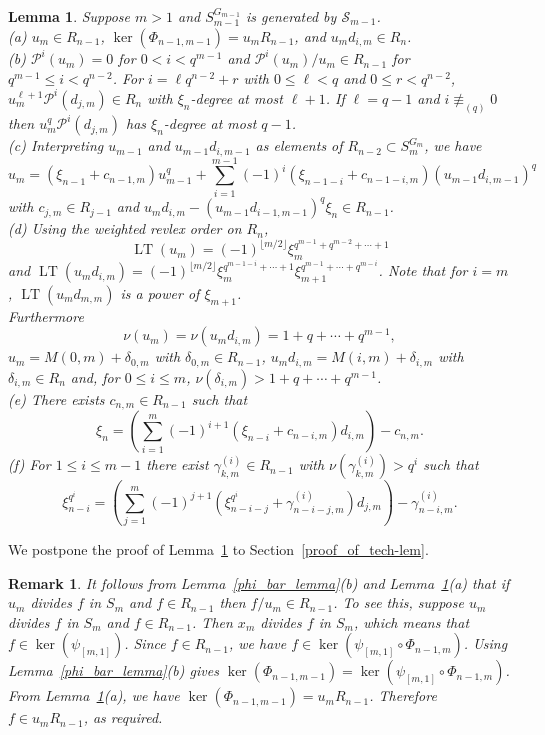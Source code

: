 \documentclass{amsart}
\newcommand{\PP}{\mathcal{P}}
\newcommand{\cS}{\mathcal{S}}
\newtheorem{lem}[subsection]{Lemma}
\newtheorem{remark}[subsection]{Remark}
\DeclareMathOperator{\lt}{LT}
\begin{document}
\begin{lem}\label{oplus_tech-lem} Suppose $m>1$ and 
$S_{m-1}^{G_{m-1}}$ is generated by 
$\cS_{m-1}$.\\
(a) $u_m\in R_{n-1}$, $\ker(\Phi_{n-1,m-1})=u_m R_{n-1}$, 
and $u_m d_{i,m}\in R_{n}$.\\
(b) $\PP^i(u_m)=0$ for $0<i<q^{m-1}$ 
and $\PP^i(u_m)/u_m\in R_{n-1}$ for $q^{m-1}\leq i<q^{n-2}$.
For $i=\ell q^{n-2}+r$ with $0\leq\ell<q$ and $0\leq r<q^{n-2}$, $u_m^{\ell+1}\PP^i(d_{j,m})\in R_{n}$ 
with $\xi_{n}$-degree at most $\ell+1$. If $\ell=q-1$ and $i\not\equiv_{(q)} 0$ then 
$u_m^q\PP^i(d_{j,m})$ has $\xi_{n}$-degree at most $q-1$.\\
(c) Interpreting $u_{m-1}$ and $u_{m-1} d_{i,m-1}$ as elements of $R_{n-2}\subset S_m^{G_m}$, we have
$$u_m=(\xi_{n-1}+c_{n-1,m})u_{m-1}^q+\sum_{i=1}^{m-1}(-1)^i(\xi_{n-1-i}+c_{n-1-i,m})(u_{m-1}d_{i,m-1})^q$$
with $c_{j,m}\in R_{j-1}$ and $u_m d_{i,m}-(u_{m-1}d_{i-1,m-1})^q\xi_{n}\in R_{n-1}$. \\
(d) Using the weighted revlex order on $R_{n}$, 
$$\lt(u_m)=(-1)^{\lfloor m/2 \rfloor}\xi_{m}^{q^{m-1}+q^{m-2}+\cdots+1}$$ and 
$\lt(u_m d_{i,m})=(-1)^{\lfloor m/2 \rfloor}\xi_{m}^{q^{m-1-i}+\cdots+1}\xi_{m+1}^{q^{m-1}+\cdots+q^{m-i}}$.
Note that for $i=m$, $\lt(u_m d_{m,m})$ is a power of $\xi_{m+1}$.\\
Furthermore $$\nu(u_m)=\nu(u_md_{i,m})=1+q+\cdots +q^{m-1},$$
$u_m=M(0,m)+\delta_{0,m}$ with $\delta_{0,m}\in R_{n-1}$,
$u_md_{i,m}=M(i,m)+\delta_{i,m}$ with $\delta_{i,m}\in R_{n}$ and, for $0\leq i\leq m$, $\nu(\delta_{i,m})>1+q+\cdots +q^{m-1}$.\\ 
(e) There exists $c_{n,m}\in R_{n-1}$ such that
 $$\xi_{n}=\left(\sum_{i=1}^{m}(-1)^{i+1}(\xi_{n-i}+c_{n-i,m})d_{i,m}\right)-c_{n,m}.$$
(f) For $1\leq i\leq m-1$ there exist $\gamma_{k,m}^{(i)}\in R_{n-1}$ with $\nu(\gamma_{k,m}^{(i)})>q^i$
such that
$$\xi_{n-i}^{q^i}=\left(\sum_{j=1}^m (-1)^{j+1}(\xi_{n-i-j}^{q^i}+\gamma_{n-i-j,m}^{(i)})d_{j,m}\right)-\gamma_{n-i,m}^{(i)}.$$
\end{lem}

We postpone the proof of Lemma~\ref{oplus_tech-lem} to 
Section~\ref{proof_of_tech-lem}.

\begin{remark}\label{um_div_rem}
It follows from Lemma~\ref{phi_bar_lemma}(b) and Lemma~\ref{oplus_tech-lem}(a)
that if $u_m$ divides $f$ in $S_m$ and $f\in R_{n-1}$ then $f/u_m\in R_{n-1}$.
To see this, suppose $u_m$ divides $f$ in $S_m$ and $f\in R_{n-1}$. 
Then $x_m$ divides $f$ in $S_m$, which means that $f\in\ker(\psi_{[m,1]})$.
Since $f\in R_{n-1}$, we have $f\in\ker(\psi_{[m,1]}\circ \Phi_{n-1,m})$.
Using  Lemma~\ref{phi_bar_lemma}(b) gives
$\ker(\Phi_{n-1,m-1})=\ker(\psi_{[m,1]}\circ \Phi_{n-1,m})$. 
From Lemma~\ref{oplus_tech-lem}(a), we have
$\ker(\Phi_{n-1,m-1})=u_m R_{n-1}$. Therefore $f\in u_mR_{n-1}$, as required.
\end{remark}
\end{document}
